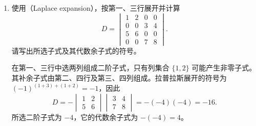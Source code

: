 \documentclass[UTF8,12pt,a4paper,fontset=fandol]{ctexart}
\begin{document}
\begin{enumerate}[label=\arabic*.,resume=detquestions]
\item\label{q:laplace}
使用（Laplace expansion），按第一、三行展开并计算
\[
D=\begin{vmatrix}
1&2&0&0\\0&0&3&4\\5&6&0&0\\0&0&7&8
\end{vmatrix}.
\]
请写出所选子式及其代数余子式的符号。
\begin{solve}
在第一、三行中选两列组成二阶子式，只有列集合 $\{1,2\}$ 可能产生非零子式。
其补余子式由第二、四行及第三、四列组成。拉普拉斯展开的符号为
$(-1)^{(1+3)+(1+2)}=-1$，因此
\[
D=-\begin{vmatrix}1&2\\5&6\end{vmatrix}
\begin{vmatrix}3&4\\7&8\end{vmatrix}
=-(-4)(-4)=-16.
\]
所选二阶子式为 $-4$，它的代数余子式为 $-(-4)=4$。
\end{solve}
\end{enumerate}
\end{document}
